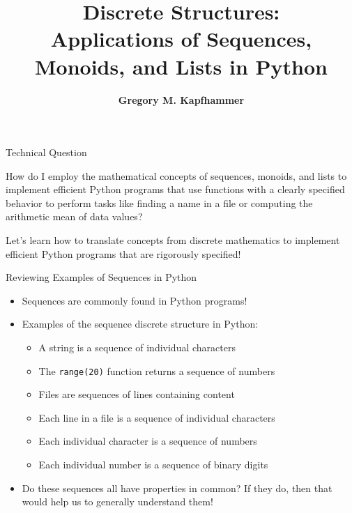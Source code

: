 \documentclass[14pt,aspectratio=169]{beamer}
\title{Discrete Structures: \\ Applications of Sequences, Monoids, and
Lists in Python}
\author{{\bf Gregory M. Kapfhammer}}
\institute[shortinst]{{\bf Department of Computer Science, Allegheny College}}
\begin{document}
{
  \begin{frame}
    \titlepage
  \end{frame}
}

%
\begin{frame}{Technical Question}
  \hspace*{.25in}
  \begin{minipage}{4.8in}
    \vspace*{.1in}
    \begin{center}
      {\large How do I employ the mathematical concepts of sequences,
        monoids, and lists to implement efficient Python programs that use
        functions with a clearly specified behavior to perform tasks like
        finding a name in a file or computing the arithmetic mean of data values?}
    \end{center}
  \end{minipage}
  \vspace{2ex}
  \begin{center}
    \small Let's learn how to translate concepts from discrete mathematics to
    implement efficient Python programs that are rigorously specified!
  \end{center}
\end{frame}

%
\begin{frame}{Reviewing Examples of Sequences in Python}
  \begin{itemize}
    \item Sequences are commonly found in Python programs!
      \vspace*{-.15in}
    \item Examples of the sequence discrete structure in Python:
      \begin{itemize}
        \item A string is a sequence of individual characters
        \item The {\tt range(20)} function returns a sequence of numbers
        \item Files are sequences of lines containing content
        \item Each line in a file is a sequence of individual characters
        \item Each individual character is a sequence of numbers
        \item Each individual number is a sequence of binary digits
      \end{itemize}
      \vspace*{-.2in}
    \item Do these sequences all have properties in common? If they do, then
      that would help us to generally understand them!
  \end{itemize}
\end{frame}
\end{document}
